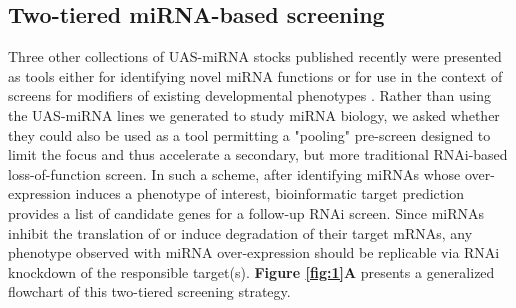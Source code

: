 \subsection*{Two-tiered miRNA-based screening}

Three other collections of UAS-miRNA stocks published recently were presented as tools either for identifying novel miRNA functions \cite{aleigh_Kim_Ni_Duan_et_al__2012,shauser_Forstemann_Basler_2012} or for use in the context of screens for modifiers of existing developmental phenotypes \cite{gler_Lim_Verma_Chen_Cohen_2012}.
Rather than using the UAS-miRNA lines we generated \cite{Suh_2015} to study miRNA biology, we asked whether they could also be used as a tool permitting a "pooling" pre-screen designed to limit the focus and thus accelerate a secondary, but more traditional RNAi-based loss-of-function screen.
In such a scheme, after identifying miRNAs whose over-expression induces a phenotype of interest, bioinformatic target prediction provides a list of candidate genes for a follow-up RNAi screen.
Since miRNAs inhibit the translation of or induce degradation of their target mRNAs, any phenotype observed with miRNA over-expression should be replicable via RNAi knockdown of the responsible target(s).
\textbf{Figure \ref{fig:1}A} presents a generalized flowchart of this two-tiered screening strategy.